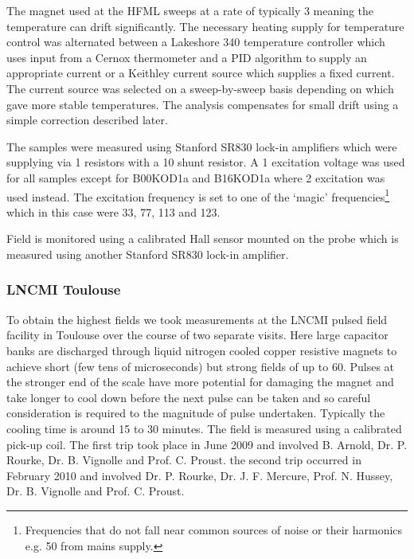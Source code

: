 The magnet used at the \ac{HFML} sweeps at a rate of typically \unit{3}{\tesla\per\minute} meaning the temperature can drift significantly. The necessary heating supply for temperature control was alternated between a Lakeshore 340 temperature controller which uses input from a Cernox thermometer and a PID algorithm to supply an appropriate current or a Keithley current source which supplies a fixed current. The current source was selected on a sweep-by-sweep basis depending on which gave more stable temperatures.  The analysis compensates for small drift using a simple correction described later. 

The samples were measured using Stanford SR830 lock-in amplifiers which were supplying via \unit{1}{\kilo\ohm} resistors with a \unit{10}{\ohm} shunt resistor. A \unit{1}{\volt} excitation voltage was used for all samples except for B00KOD1a and B16KOD1a where \unit{2}{\volt} excitation was used instead. The excitation frequency is set to one of the `magic' frequencies\footnote{Frequencies that do not fall near common sources of noise or their harmonics e.g. \unit{50}{\hertz} from mains supply.} which in this case were \unit{33}{\hertz}, \unit{77}{\hertz}, \unit{113}{\hertz} and \unit{123}{\hertz}.

Field is monitored using a calibrated Hall sensor mounted on the probe which is measured using another Stanford SR830 lock-in amplifier.

\subsubsection{\acs{LNCMI} Toulouse}

To obtain the highest fields we took measurements at the \acf{LNCMI} pulsed field facility in Toulouse over the course of two separate visits. Here large capacitor banks are discharged through liquid nitrogen cooled copper resistive magnets to achieve short (few tens of microseconds) but strong fields of up to \unit{60}{\tesla}. Pulses at the stronger end of the scale have more potential for damaging the magnet and take longer to cool down before the next pulse can be taken and so careful consideration is required to the magnitude of pulse undertaken. Typically the cooling time is around 15 to 30 minutes. The field is measured using a calibrated pick-up coil. The first trip took place in June 2009 and involved B. Arnold, Dr. P. Rourke, Dr. B. Vignolle and Prof. C. Proust. the second trip occurred in February 2010 and involved Dr. P. Rourke, Dr. J. F. Mercure, Prof. N. Hussey, Dr. B. Vignolle and Prof. C. Proust.

